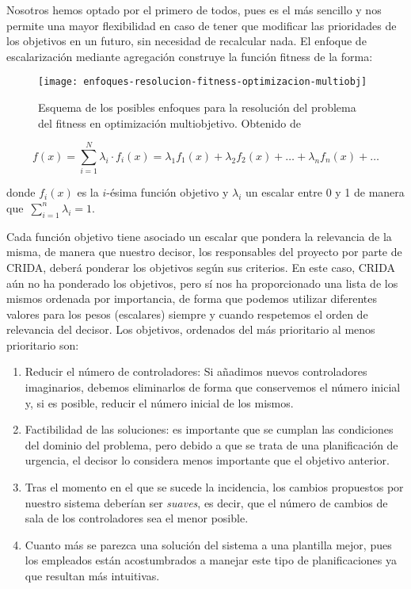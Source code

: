 Nosotros hemos optado por el primero de todos, pues es el más sencillo y nos permite una mayor flexibilidad en caso de tener que modificar las prioridades de los objetivos en un futuro, sin necesidad de recalcular nada. El enfoque de escalarización mediante agregación construye la función fitness de la forma:

\begin{figure}
    \centering
    \texttt{[image: enfoques-resolucion-fitness-optimizacion-multiobj]}
    \caption[Esquema de los posibles enfoques para la resolución del problema del fitness en optimización multiobjetivo]{Esquema de los posibles enfoques para la resolución del problema del fitness en optimización multiobjetivo. Obtenido de~\cite{sota:metaheuristicas-design-impl}}
    \label{fig:enfoques-fitness-multiobj}
\end{figure}
%
\[
    f(x) = \sum_{i=1}^{N} \lambda_i \cdot f_i(x) = \lambda_1 f_1(x) + \lambda_2 f_2(x) + \dots + \lambda_n f_n(x) + \dots
\]

donde $f_i(x)$ es la $i$-ésima función objetivo y $\lambda_i$ un escalar entre 0 y 1 de manera que~$\sum_{i=1}^n \lambda_i = 1$.

Cada función objetivo tiene asociado un escalar que pondera la relevancia de la misma, de manera que nuestro decisor, los responsables del proyecto por parte de \gls{CRIDA}, deberá ponderar los objetivos según sus criterios. En este caso, CRIDA aún no ha ponderado los objetivos, pero sí nos ha proporcionado una lista de los mismos ordenada por importancia, de forma que podemos utilizar diferentes valores para los pesos (escalares) siempre y cuando respetemos el orden de relevancia del decisor. Los objetivos, ordenados del más prioritario al menos prioritario son:

\begin{enumerate}[label={O\arabic*}]
    \item \label{O1} Reducir el número de controladores: Si añadimos nuevos controladores imaginarios, debemos eliminarlos de forma que conservemos el número inicial y, si es posible, reducir el número inicial de los mismos.

    \item \label{O2} Factibilidad de las soluciones: es importante que se cumplan las condiciones del dominio del problema, pero debido a que se trata de una planificación de urgencia, el decisor lo considera menos importante que el objetivo anterior.

    \item \label{O3} Tras el momento en el que se sucede la incidencia, los cambios propuestos por nuestro sistema deberían ser \textit{suaves}, es decir, que el número de cambios de sala de los controladores sea el menor posible.

    \item \label{O4} Cuanto más se parezca una solución del sistema a una plantilla mejor, pues los empleados están acostumbrados a manejar este tipo de planificaciones ya que resultan más intuitivas.
\end{enumerate}

